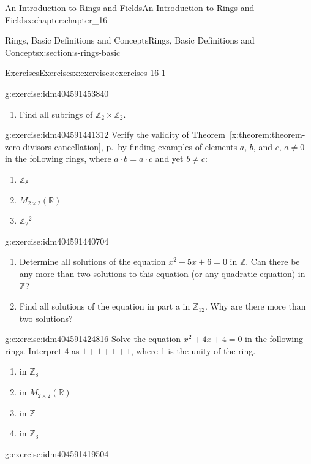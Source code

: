 \documentclass[twoside,10pt,]{book}
\newcommand{\xreffont}{\relax}
\numberwithin{equation}{section}
\begin{document}
\begin{chapterptx}{An Introduction to Rings and Fields}{}{An Introduction to Rings and Fields}{}{}{x:chapter:chapter_16}
\begin{sectionptx}{Rings, Basic Definitions and Concepts}{}{Rings, Basic Definitions and Concepts}{}{}{x:section:s-rings-basic}
\begin{exercises-subsection}{Exercises}{}{Exercises}{}{}{x:exercises:exercises-16-1}
\begin{divisionexercise}{5}{}{}{g:exercise:idm404591453840}
\begin{enumerate}[label=(\alph*)]
\item{}Find all subrings of \(\mathbb{Z}_2 \times \mathbb{Z}_2\).%
\end{enumerate}
%
\end{divisionexercise}%
\begin{divisionexercise}{6}{}{}{g:exercise:idm404591441312}%
Verify the validity of \hyperref[x:theorem:theorem-zero-divisors-cancellation]{Theorem~{\xreffont\ref{x:theorem:theorem-zero-divisors-cancellation}}, p.\,\pageref{x:theorem:theorem-zero-divisors-cancellation}} by finding examples of elements \(a\), \(b\), and \(c\),  \(a  \neq   0\) in the following rings, where \(a \cdot b = a \cdot  c\) and yet  \(b \neq  c\):%
\begin{enumerate}[label=(\alph*)]
\item{}\(\mathbb{Z}_8\)%
\item{}\(M_{2\times 2}(\mathbb{R})\)%
\item{}\(\mathbb{Z}_2{}^2\)%
\end{enumerate}
%
\end{divisionexercise}%
\begin{divisionexercise}{7}{}{}{g:exercise:idm404591440704}%
%
\begin{enumerate}[label=(\alph*)]
\item{}Determine all solutions of the equation \(x^2 - 5x + 6 = 0\) in \(\mathbb{Z}\).  Can there be any more than two solutions to this equation (or any quadratic equation) in \(\mathbb{Z}\)?%
\item{}Find all solutions of the equation in part a in \(\mathbb{Z}_{12}\). Why are there more than two solutions?%
\end{enumerate}
%
\end{divisionexercise}%
\begin{divisionexercise}{8}{}{}{g:exercise:idm404591424816}%
Solve the equation \(x^2 +4x + 4 = 0\) in the following rings. Interpret 4 as \(1 + 1 + 1 + 1\), where 1 is the unity of the ring.%
\begin{enumerate}[label=(\alph*)]
\item{}in  \(\mathbb{Z}_8\)%
\item{}in \(M_{2\times 2}(\mathbb{R})\)%
\item{}in  \(\mathbb{Z}\)%
\item{}in  \(\mathbb{Z}_3\)%
\end{enumerate}
%
\end{divisionexercise}%
\begin{divisionexercise}{9}{}{}{g:exercise:idm404591419504}%

\end{divisionexercise}
\end{exercises-subsection}
\end{sectionptx}
\end{chapterptx}
\end{document}
